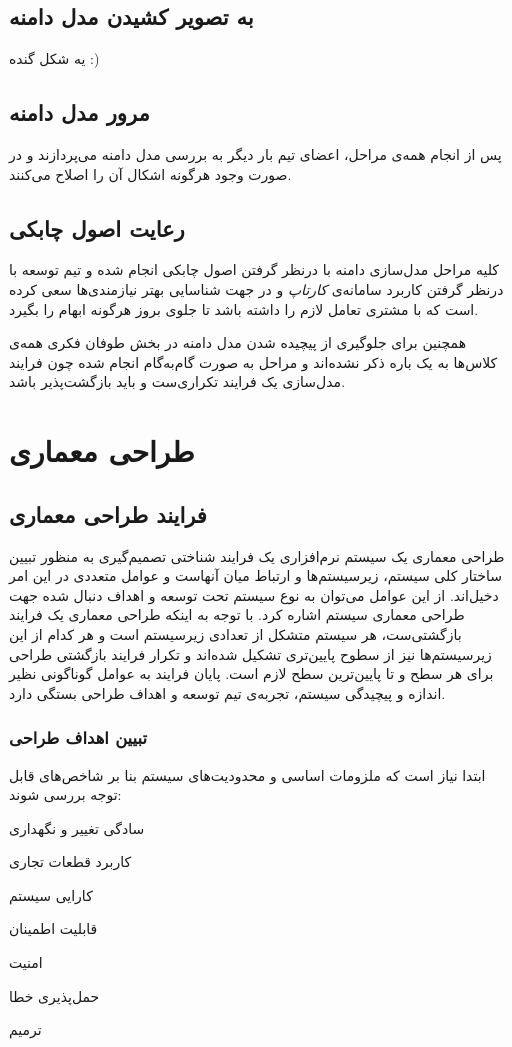 \documentclass[12pt,svgnames,oneside]{book}
\newcounter{itemadded}
\let\LaTeXStandardEnumerateBegin\enumerate
\let\LaTeXStandardEnumerateEnd\endenumerate
\renewenvironment{enumerate}{%
\LaTeXStandardEnumerateBegin%
\setcounter{itemadded}{0}
}{%
\LaTeXStandardEnumerateEnd%
}%
\begin{document}
\section{به تصویر کشیدن مدل دامنه}
یه شکل گنده :)
\section{مرور مدل دامنه}
پس از انجام همه‌ی مراحل، اعضای تیم بار دیگر به بررسی مدل دامنه می‌پردازند و در صورت وجود هرگونه اشکال آن را اصلاح می‌کنند.

\section{رعایت اصول چابکی}
کلیه مراحل مدل‌سازی دامنه با درنظر گرفتن اصول چابکی انجام شده و تیم توسعه با درنظر گرفتن کاربرد سامانه‌ی \textit{کارتاپ} و در جهت شناسایی بهتر نیازمندی‌ها سعی کرده است که با مشتری تعامل لازم را داشته باشد تا جلوی بروز هرگونه ابهام را بگیرد.

همچنین برای جلوگیری از پیچیده‌ شدن مدل دامنه در بخش طوفان فکری همه‌ی کلاس‌ها به یک باره ذکر نشده‌اند و مراحل به صورت گام‌به‌گام انجام شده چون فرایند مدل‌سازی یک فرایند تکراری‌ست و باید بازگشت‌پذیر باشد.

\chapter{طراحی معماری}

\section{فرایند طراحی معماری}	
طراحی معماری یک سیستم نرم‌افزاری یک فرایند شناختی تصمیم‌گیری به منظور تبیین ساختار کلی سیستم، زیرسیستم‌ها و ارتباط میان آنهاست و عوامل متعددی در این امر دخیل‌اند. از این عوامل می‌توان به نوع سیستم تحت توسعه و اهداف دنبال شده جهت طراحی معماری سیستم اشاره کرد. با توجه به اینکه طراحی معماری یک فرایند بازگشتی‌ست، هر سیستم متشکل از تعدادی زیرسیستم است و هر کدام از این زیرسیستم‌ها نیز از سطوح پایین‌تری تشکیل شده‌اند و تکرار فرایند بازگشتی طراحی برای هر سطح و تا پایین‌ترین سطح لازم است. پایان فرایند به عوامل گوناگونی نظیر اندازه و پیچیدگی سیستم، تجربه‌ی تیم توسعه و اهداف طراحی بستگی دارد.

\subsection{تبیین اهداف طراحی}			
ابتدا نیاز است که ملزومات اساسی و محدودیت‌های سیستم بنا بر شاخص‌های قابل توجه بررسی شوند:
\begin{enumerate}
\item
سادگی تغییر و نگهداری
\item
کاربرد قطعات تجاری
\item
کارایی سیستم
\item
قابلیت اطمینان
\item
امنیت
\item
حمل‌پذیری خطا
\item
ترمیم
\end{enumerate}
\end{document}
